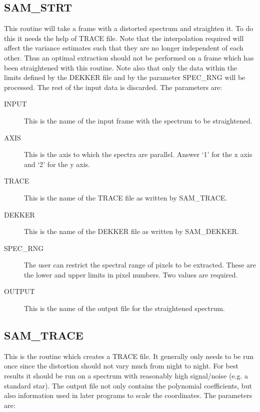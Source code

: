 \subsection{SAM\_STRT}

This routine will take a frame with a distorted spectrum and straighten it. To
do this it needs the help of TRACE file.  Note that the interpolation required
will affect the variance estimates such that they are no longer independent of
each other.  Thus an optimal extraction should not be  performed on a frame
which has been straightened with this routine.  Note also that only the data
within the limits defined by the DEKKER file and by the parameter SPEC\_RNG
will be processed.  The rest of the input data is discarded. The parameters
are:

\begin{description}
\begin{description}

\item[INPUT] This is the name of the input frame with the spectrum to be
straightened.

\item[AXIS] This is the axis to which the spectra are parallel.  Answer `1' for
the x axis and `2' for the y axis.

\item[TRACE] This is the name of the TRACE file as written by SAM\_TRACE.

\item[DEKKER] This is the name of the DEKKER file as written by SAM\_DEKKER.

\item[SPEC\_RNG] The user can restrict the spectral range of pixels to be extracted.
These are the lower and upper limits in pixel numbers.  Two values are
required.

\item[OUTPUT] This is the name of the output file for the straightened
spectrum.

\end{description}
\end{description}

\subsection{SAM\_TRACE}

This is the routine which creates a TRACE file.  It generally only needs to be
run once since the distortion should not vary much from night to night.  For
best results it should be run on a spectrum with reasonably high  signal/noise
(e.g. a standard star).  The output file not only contains the polynomial
coefficients, but also information used in later programs to scale the
coordinates.  The parameters are:

